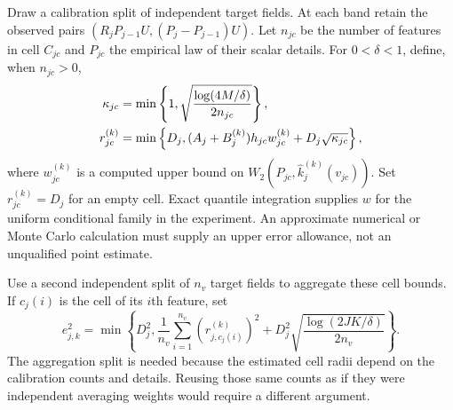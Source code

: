 Draw a calibration split of independent target fields. At each band retain the observed pairs $(R_jP_{j-1}U,(P_j-P_{j-1})U)$. Let $n_{jc}$ be the number of features in cell $C_{jc}$ and $P_{jc}$ the empirical law of their scalar details. For $0<\delta<1$, define, when $n_{jc}>0$,
\begin{align}\label{eq:cell-radius}
 \kappa_{jc}&=\min\left\{1,\sqrt{\frac{\log(4M/\delta)}{2n_{jc}}}\right\},\\
 r_{jc}^{(k)}&=\min\left\{D_j,
 (A_j+B_j^{(k)})h_{jc}
 w_{jc}^{(k)}+D_j\sqrt{\kappa_{jc}}\right\},\notag
\end{align}
where $w_{jc}^{(k)}$ is a computed upper bound on
$W_2(P_{jc},\widehat k_j^{(k)}(v_{jc}))$. Set $r_{jc}^{(k)}=D_j$ for an empty cell. Exact quantile integration supplies $w$ for the uniform conditional family in the experiment. An approximate numerical or Monte Carlo calculation must supply an upper error allowance, not an unqualified point estimate.

Use a second independent split of $n_v$ target fields to aggregate these cell bounds. If $c_j(i)$ is the cell of its $i$th feature, set
\begin{equation}\label{eq:observed-error}
 e_{j,k}^2=\min\left\{D_j^2,
 \frac1{n_v}\sum_{i=1}^{n_v}(r_{j,c_j(i)}^{(k)})^2
 +D_j^2\sqrt{\frac{\log(2JK/\delta)}{2n_v}}\right\}.
\end{equation}
The aggregation split is needed because the estimated cell radii depend on the calibration counts and details. Reusing those same counts as if they were independent averaging weights would require a different argument.

